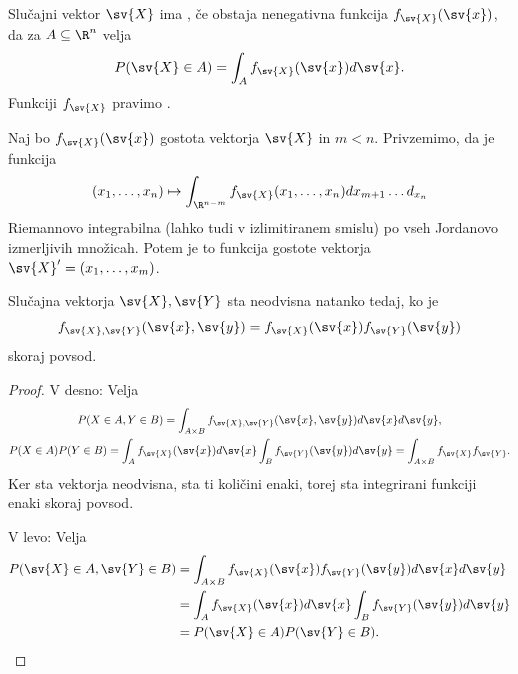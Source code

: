 
\begin{definicija}
  Slučajni vektor $\sv{X}$ ima , če obstaja
  nenegativna funkcija $f_{\sv{X}}(\sv{x})$, da za $A \subseteq \R^n$ velja
  \[
	P(\sv{X} \in A) = \int_A f_{\sv{X}}(\sv{x}) d\sv{x}.
  \]
  Funkciji $f_{\sv{X}}$ pravimo .
\end{definicija}


\begin{izrek}
  Naj bo $f_{\sv{X}}(\sv{x})$ gostota vektorja $\sv{X}$ in $m < n$.
  Privzemimo, da je funkcija
  \[
	(x_1, \ldots, x_n) \mapsto \int_{\R^{n-m}} f_{\sv{X}}(x_1, \ldots, x_n)
	dx_{m+1} \ldots d_{x_n}
  \]
  Riemannovo integrabilna (lahko tudi v izlimitiranem smislu) po vseh Jordanovo
  izmerljivih množicah.
  Potem je to funkcija gostote vektorja $\sv{X}' = (x_1, \ldots, x_m)$.
\end{izrek}

\begin{izrek}
  Slučajna vektorja $\sv{X}, \sv{Y}$ sta neodvisna natanko tedaj, ko je
  \[
	f_{\sv{X}, \sv{Y}}(\sv{x}, \sv{y}) = f_{\sv{X}}(\sv{x}) f_{\sv{Y}}(\sv{y})
  \]
  skoraj povsod.
\end{izrek}

\begin{proof}
  V desno:
  Velja
  \begin{gather*}
	P(X \in A, Y \in B) = \int_{A \times B} f_{\sv{X}, \sv{Y}}(\sv{x}, \sv{y})
	d\sv{x} d\sv{y}, \\
	P(X \in A) P(Y \in B)
	= \int_A f_{\sv{X}}(\sv{x}) d\sv{x} \int_B f_{\sv{Y}}(\sv{y}) d\sv{y}
	= \int_{A \times B} f_{\sv{X}} f_{\sv{Y}}.
  \end{gather*}
  Ker sta vektorja neodvisna, sta ti količini enaki, torej sta integrirani
  funkciji enaki skoraj povsod.

  V levo:
  Velja
  \begin{align*}
	P(\sv{X} \in A, \sv{Y} \in B)
	&= \int_{A \times B} f_{\sv{X}}(\sv{x}) f_{\sv{Y}}(\sv{y}) d\sv{x} d\sv{y} \\
	&= \int_A f_{\sv{X}}(\sv{x}) d\sv{x} \int_B f_{\sv{Y}}(\sv{y}) d\sv{y} \\
	&= P(\sv{X} \in A) P(\sv{Y} \in B).
  \end{align*}
\end{proof}



